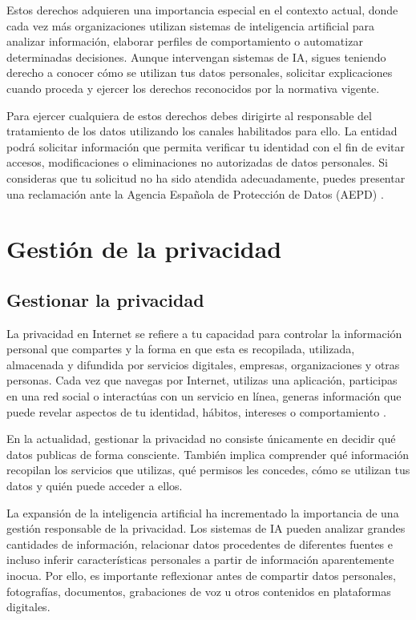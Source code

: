 \documentclass[
  spanish,
  a4paper,
  openany]{book}
\begin{document}
Estos derechos adquieren una importancia especial en el contexto actual, donde cada vez más organizaciones utilizan sistemas de inteligencia artificial para analizar información, elaborar perfiles de comportamiento o automatizar determinadas decisiones. Aunque intervengan sistemas de IA, sigues teniendo derecho a conocer cómo se utilizan tus datos personales, solicitar explicaciones cuando proceda y ejercer los derechos reconocidos por la normativa vigente.

Para ejercer cualquiera de estos derechos debes dirigirte al responsable del tratamiento de los datos utilizando los canales habilitados para ello. La entidad podrá solicitar información que permita verificar tu identidad con el fin de evitar accesos, modificaciones o eliminaciones no autorizadas de datos personales. Si consideras que tu solicitud no ha sido atendida adecuadamente, puedes presentar una reclamación ante la Agencia Española de Protección de Datos (AEPD) \citep{AEPD}.

\chapter{Gestión de la privacidad}\label{gestiuxf3n-de-la-privacidad}

\section{Gestionar la privacidad}\label{gestionar-la-privacidad}

La privacidad en Internet se refiere a tu capacidad para controlar la información personal que compartes y la forma en que esta es recopilada, utilizada, almacenada y difundida por servicios digitales, empresas, organizaciones y otras personas. Cada vez que navegas por Internet, utilizas una aplicación, participas en una red social o interactúas con un servicio en línea, generas información que puede revelar aspectos de tu identidad, hábitos, intereses o comportamiento \citep{WIKI-privacidad}.

En la actualidad, gestionar la privacidad no consiste únicamente en decidir qué datos publicas de forma consciente. También implica comprender qué información recopilan los servicios que utilizas, qué permisos les concedes, cómo se utilizan tus datos y quién puede acceder a ellos.

La expansión de la inteligencia artificial ha incrementado la importancia de una gestión responsable de la privacidad. Los sistemas de IA pueden analizar grandes cantidades de información, relacionar datos procedentes de diferentes fuentes e incluso inferir características personales a partir de información aparentemente inocua. Por ello, es importante reflexionar antes de compartir datos personales, fotografías, documentos, grabaciones de voz u otros contenidos en plataformas digitales.
\end{document}
